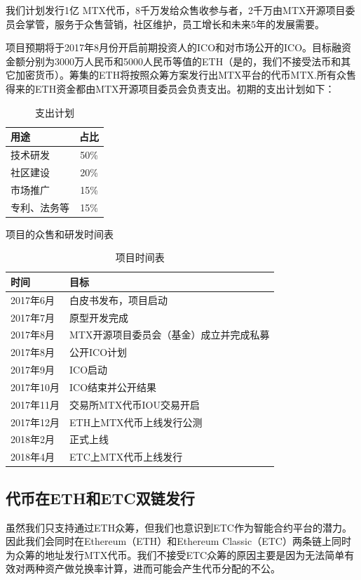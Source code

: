 \documentclass[UTF8,nofonts]{ctexart}
\begin{document}
我们计划发行1亿 MTX代币，8千万发给众售收参与者，2千万由MTX开源项目委员会掌管，服务于众售营销，社区维护，员工增长和未来5年的发展需要。

项目预期将于2017年8月份开启前期投资人的ICO和对市场公开的ICO。目标融资金额分别为3000万人民币和5000人民币等值的ETH（是的，我们不接受法币和其它加密货币）。筹集的ETH将按照众筹方案发行出MTX平台的代币MTX.所有众售得来的ETH资金都由MTX开源项目委员会负责支出。初期的支出计划如下：

\begin{table}[hbt]
  \centering
  \begin{tabular}{l|c}
 用途   & 占比\\
    \hline
  技术研发 & 50\% \\
  社区建设 & 20\% \\
  市场推广 & 15\% \\
  专利、法务等 & 15\% \\
  \end{tabular}
  \caption{支出计划}
\end{table}


项目的众售和研发时间表
\begin{table}[hbt]
  \centering
  \begin{tabular}{l|l}
 时间   & 目标\\
    \hline
  2017年6月 & 白皮书发布，项目启动 \\
  2017年7月 & 原型开发完成 \\
  2017年8月 & MTX开源项目委员会（基金）成立并完成私募 \\
  2017年8月 & 公开ICO计划 \\
  2017年9月 & ICO启动 \\
  2017年10月 & ICO结束并公开结果 \\
  2017年11月 & 交易所MTX代币IOU交易开启 \\
  2017年12月 & ETH上MTX代币上线发行公测 \\
  2018年2月 & 正式上线 \\
  2018年4月 & ETC上MTX代币上线发行 \\
  \end{tabular}
  \caption{项目时间表}
\end{table}

\subsection{代币在ETH和ETC双链发行\label{sec:chains}}

虽然我们只支持通过ETH众筹，但我们也意识到ETC作为智能合约平台的潜力。因此我们会同时在Ethereum（ETH）和Ethereum Classic（ETC）两条链上同时为众筹的地址发行MTX代币。我们不接受ETC众筹的原因主要是因为无法简单有效对两种资产做兑换率计算，进而可能会产生代币分配的不公。
\end{document}
